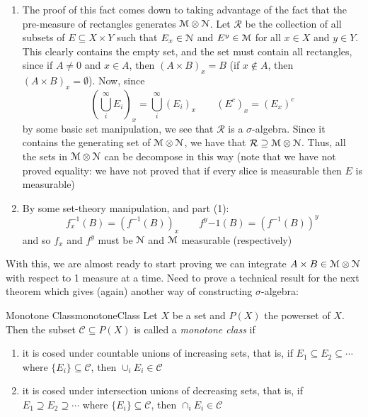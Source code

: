 \documentclass[oneside]{book}
\newcommand{\EM}{\EuScript{M}}
\newcommand{\EN}{\EuScript{N}}
\newcommand{\CC}{\mathcal{C}}
\newcommand{\sse}{\subseteq}
\begin{document}
\begin{Proof}
	\begin{enumerate}
		\item The proof of this fact comes down to taking advantage of the fact that the pre-measure of rectangles
			generates $\EM\otimes \EN$. Let $\mathcal{R}$ be the collection of all subsets of $E \sse X\times Y$ such
			that $E_x \in \EN$ and $E^y \in \EM$ for all $x \in X$ and $y \in Y$. This clearly contains the empty set,
			and the set must contain all rectangles, since if $A\ne 0 $ and $x \in A$, then $(A\times B)_x = B$ (if $x
			\notin A$, then $(A\times B)_x = \emptyset$). Now, since
			\[
				\left(\bigcup_i^\infty E_i\right)_x = \bigcup_i^\infty (E_i)_x \qquad (E^c)_x = (E_x)^c
			\]
			by some basic set manipulation, we see that $\mathcal{R}$ is a $\sigma$-algebra. Since it contains the
			generating set of $\EM\otimes \EN$, we have that $\mathcal{R} \supseteq \EM\otimes \EN$. Thus, all the sets
			in $\EM\otimes \EN$ can be decompose in this way (note that we have not proved equality: we have not proved
			that if every slice is measurable then $E$ is measurable)
		\item By some set-theory manipulation, and part (1):
			\[
				f_x^{-1}(B) = (f^{-1}(B))_x \qquad f^y{-1}(B) = (f^{-1}(B))^y
			\]
			and so $f_x$ and $f^y$ must be $\EN$ and $\EM$ measurable (respectively)
	\end{enumerate}
\end{Proof}

With this, we are almost ready to start proving we can integrate $A\times B \in \EM\otimes \EN$ with respect to
1 measure at a time. Need to prove a technical result for the next theorem which gives (again) another way of
constructing $\sigma$-algebra:

\begin{defn}{Monotone Class}{monotoneClass}
	Let $X$ be a set and $P(X)$ the powerset of $X$. Then the subset $\CC \sse P(X)$ is called a \emph{monotone class}
	if 
	\begin{enumerate}
		\item it is cosed under countable unions of increasing sets, that is, if $E_1 \sse E_2 \sse \cdots$ where
			$\{E_i\} \sse \CC$, then $\cup_i E_i \in \CC$
		\item it is cosed under intersection unions of decreasing sets, that is, if $E_1 \supseteq E_2 \supseteq \cdots$ where
			$\{E_i\} \sse \CC$, then $\cap_i E_i \in \CC$
	\end{enumerate}
\end{defn}
\end{document}
